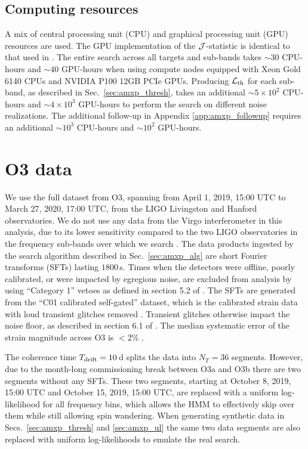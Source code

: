 \subsection{Computing resources \label{sec:amxp_computing}}
A mix of central processing unit (CPU) and graphical processing unit (GPU) resources are used. The GPU implementation of the $\mathcal{J}$-statistic is identical to that used in \citet{o2vitsco, Middleton2020}. The entire search across all targets and sub-bands takes $\sim30$ CPU-hours and $\sim40$ GPU-hours when using compute nodes equipped with Xeon Gold 6140 CPUs and NVIDIA P100 12GB PCIe GPUs. Producing $\mathcal{L}_{\rm th}$ for each sub-band, as described in Sec.~\ref{sec:amxp_thresh}, takes an additional $\sim 5\times10^2$ CPU-hours and $\sim 4\times10^3$ GPU-hours to perform the search on different noise realizations. The additional follow-up in Appendix \ref{app:amxp_followup} requires an additional $\sim 10^3$ CPU-hours and $\sim 10^2$ GPU-hours.

\section{O3 data \label{sec:amxp_o3data}}
We use the full dataset from O3, spanning from April 1, 2019, 15:00 UTC to March 27, 2020, 17:00 UTC, from the LIGO Livingston and Hanford observatories. We do not use any data from the Virgo interferometer in this analysis, due to its lower sensitivity compared to the two LIGO observatories in the frequency sub-bands over which we search \cite{o23DetChar}. The data products ingested by the search algorithm described in Sec.~\ref{sec:amxp_alg} are short Fourier transforms (SFTs) lasting $1800\,$s. Times when the detectors were offline, poorly calibrated, or were impacted by egregious noise, are excluded from analysis by using ``Category 1'' vetoes as defined in section 5.2 of \citet{o23DetChar}. The SFTs are generated from the ``C01 calibrated self-gated'' dataset, which is the calibrated strain data with loud transient glitches removed \cite{o3gating}. Transient glitches otherwise impact the noise floor, as described in section 6.1 of \citet{o23DetChar}. The median systematic error of the strain magnitude across O3 is $<2\%$ \cite{Sun2020, Sun2021}.

The coherence time $T_{\textrm{drift}}=10\,$d splits the data into $N_T=36$ segments. However, due to the month-long commissioning break between O3a and O3b there are two segments without any SFTs. These two segments, starting at October 8, 2019, 15:00 UTC and October 15, 2019, 15:00 UTC, are replaced with a uniform log-likelihood for all frequency bins, which allows the HMM to effectively skip over them while still allowing spin wandering. When generating synthetic data in Secs.~\ref{sec:amxp_thresh} and \ref{sec:amxp_ul} the same two data segments are also replaced with uniform log-likelihoods to emulate the real search.

